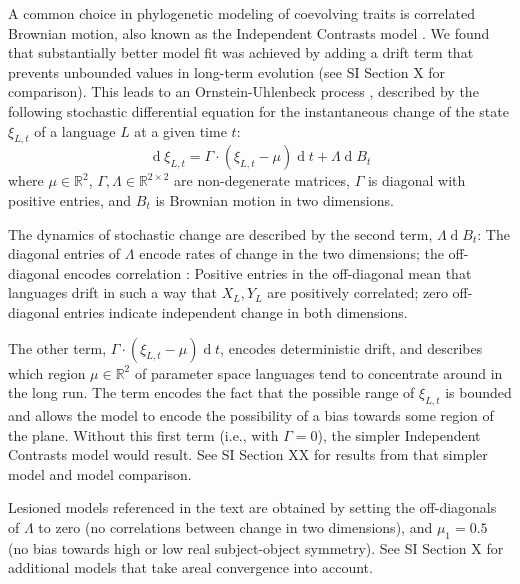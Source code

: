 \documentclass[11pt,a4paper]{article}
\begin{document}
A common choice in phylogenetic modeling of coevolving traits is correlated Brownian motion, also known as the Independent Contrasts model \citep{felsenstein1973maximum,freckleton2012fast}.
We found that substantially better model fit was achieved by adding a drift term that prevents unbounded values  in long-term evolution (see SI Section X for comparison).
This leads to an Ornstein-Uhlenbeck process \citep{blackwell2003bayesian}, described by the following stochastic differential equation for the instantaneous change of the state $\xi_{L,t}$ of a language $L$ at a given time $t$:
\begin{equation*}
    \operatorname{d}\xi_{L,t} = \Gamma \cdot (\xi_{L,t}-\mu) \operatorname{d}t + \Lambda \operatorname{d}B_t
\end{equation*}
where $\mu \in \mathbb{R}^2$,  $\Gamma, \Lambda \in \mathbb{R}^{2\times 2}$ are non-degenerate matrices, $\Gamma$ is diagonal with positive entries, and $B_t$ is Brownian motion in two dimensions.

The dynamics of stochastic change are described by the second term, $\Lambda \operatorname{d}B_t$:
The diagonal entries of $\Lambda$ encode rates of change in the two dimensions; the off-diagonal encodes correlation \citep{felsenstein1973maximum,freckleton2012fast}: Positive entries in the off-diagonal mean that languages drift in such a way that $X_L, Y_L$ are positively correlated; zero off-diagonal entries indicate independent change in both dimensions.



The other term, $\Gamma \cdot (\xi_{L,t}-\mu) \operatorname{d}t$, encodes deterministic drift, and describes which region $\mu \in \mathbb{R}^2$ of parameter space languages tend to concentrate around in the long run.
The term encodes the fact that the possible range of $\xi_{L,t}$ is bounded and allows the model to encode the possibility of a bias towards some region of the plane.
Without this first term (i.e., with $\Gamma =0$), the simpler Independent Contrasts model \citep{felsenstein1973maximum,freckleton2012fast} would result. See SI Section XX for results from that simpler model and model comparison.

Lesioned models referenced in the text are obtained by setting the off-diagonals of $\Lambda$ to zero (no correlations between change in two dimensions), and $\mu_1=0.5$ (no bias towards high or low real subject-object symmetry).
See SI Section X for additional models that take areal convergence into account.
\end{document}
